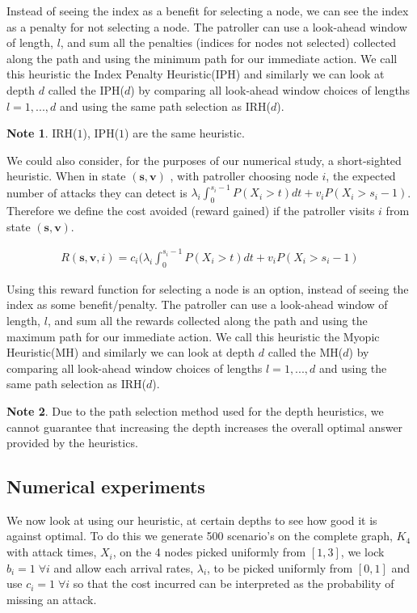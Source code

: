 \documentclass[a4paper,10pt]{article}
\theoremstyle{definition}
\theoremstyle{definition}
\theoremstyle{remark}
\theoremstyle{definition}
\newtheorem*{note}{Note}
\begin{document}
Instead of seeing the index as a benefit for selecting a node, we can see the index as a penalty for not selecting a node. The patroller can use a look-ahead window of length, $l$, and sum all the penalties (indices for nodes not selected) collected along the path and using the minimum path for our immediate action. We call this heuristic the Index Penalty Heuristic(IPH) and similarly we can look at depth $d$ called the IPH($d$) by comparing all look-ahead window choices of lengths $l=1,...,d$ and using the same path selection as IRH($d$).

\begin{note}
IRH($1$), IPH($1$) are the same heuristic.
\end{note}

We could also consider, for the purposes of our numerical study, a short-sighted heuristic. When in state $(\bm{s},\bm{v})$ , with patroller choosing node $i$, the expected number of attacks they can detect is $\lambda_{i} \int_{0}^{s_{i}-1} P(X_{i} > t ) dt + v_{i} P(X_{i} > s_{i}-1)$. Therefore we define the cost avoided (reward gained) if the patroller visits $i$ from state $(\bm{s},\bm{v})$.

\begin{align*}
R(\bm{s},\bm{v},i)= c_{i} ( \lambda_{i} \int_{0}^{s_{i}-1} P(X_{i} > t ) dt + v_{i} P(X_{i} > s_{i}-1)
\end{align*}

Using this reward function for selecting a node is an option, instead of seeing the index as some benefit/penalty. The patroller can use a look-ahead window of length, $l$, and sum all the rewards collected along the path and using the maximum path for our immediate action. We call this heuristic the Myopic Heuristic(MH) and similarly we can look at depth $d$ called the MH($d$) by comparing all look-ahead window choices of lengths $l=1,...,d$ and using the same path selection as IRH($d$).

\begin{note}
Due to the path selection method used for the depth heuristics, we cannot guarantee that increasing the depth increases the overall optimal answer provided by the heuristics.
\end{note}

\subsection{Numerical experiments}
We now look at using our heuristic, at certain depths to see how good it is against optimal. To do this we generate 500 scenario's on the complete graph, $K_{4}$ with attack times, $X_{i}$, on the 4 nodes picked uniformly from $[1,3]$, we lock $b_{i}=1 \; \forall i$ and allow each arrival rates, $\lambda_{i}$, to be picked uniformly from $[0,1]$ and use $c_{i}=1 \; \forall i$ so that the cost incurred can be interpreted as the probability of missing an attack.
\end{document}
